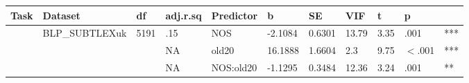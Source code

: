 \begin{table}[ht]
\centering
\begingroup\normalsize
\begin{tabular}{lllllllllll}
  \hline
Task & Dataset & df & adj.r.sq & Predictor & b & SE & VIF & t & p &  \\ 
  \hline
 & BLP\_SUBTLEXuk & 5191 & .15 & NOS & -2.1084 & 0.6301 & 13.79 & 3.35 & .001 & *** \\ 
   &  &  & NA & old20 & 16.1888 & 1.6604 & 2.3 & 9.75 & $<$.001 & *** \\ 
   &  &  & NA & NOS:old20 & -1.1295 & 0.3484 & 12.36 & 3.24 & .001 & ** \\ 
   \hline
\end{tabular}
\endgroup
\end{table}
